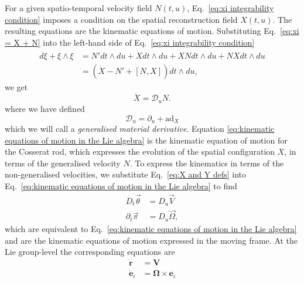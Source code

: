 For a given spatio-temporal velocity field $N(t,u)$, Eq.~\ref{eq:xi integrability condition} imposes a condition on the spatial reconstruction field $X(t,u)$. The resulting equations are the kinematic equations of motion. Substituting Eq.~\ref{eq:xi = X + N} into the left-hand side of Eq.~\ref{eq:xi integrability condition}
\begin{equation}
\begin{aligned}
d \xi + \xi \wedge \xi & = N' dt \wedge du + \dot{X} dt \wedge du + X N dt \wedge du  + N X dt \wedge du \\ 
& = (\dot{X} - N' + [N, X]) dt \wedge du,
\end{aligned}
\end{equation}
we get
\begin{equation} \label{eq:kinematic equations of motion in the Lie algebra}
\dot{X} = \mathcal{D}_u N.
\end{equation}
where we have defined
\begin{equation}
\mathcal{D}_u = \partial_u + \text{ad}_X
\end{equation}
which we will call a \textit{generalised material derivative}. Equation \ref{eq:kinematic equations of motion in the Lie algebra} is the kinematic equation of motion for the Cosserat rod, which expresses the evolution of the spatial configuration $X$, in terms of the generalised velocity $N$. To express the kinematics in terms of the non-generalised velocities, we substitute Eq.~\ref{eq:X and Y defs} into Eq.~\ref{eq:kinematic equations of motion in the Lie algebra} to find
\begin{subequations} \label{eq:kinematic equations of motion in the moving frame}
\begin{align}
D_t \vec{\theta} & = D_u \vec{V} \\
\partial_t \vec{\pi} & = D_u \vec{\Omega}, \label{eq:pi eom}
\end{align}
\end{subequations}
which are equivalent to Eq.~\ref{eq:kinematic equations of motion in the Lie algebra} and are the kinematic equations of motion expressed in the moving frame. At the Lie group-level the corresponding equations are
\begin{subequations} \label{eq:kinematic equations of motion in the fixed frame}
\begin{align}
\dot{\mathbf{r}} & = \mathbf{V} \\
\dot{\mathbf{e}}_i & = \boldsymbol{\Omega} \times \mathbf{e}_i \label{eq:e_i eom}
\end{align}
\end{subequations} %
